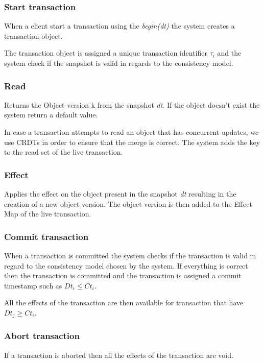 \documentclass[parallelisme]{compas2022}
\begin{document}
\subsubsection{Start transaction}
When a client start a transaction using the \emph{begin(dt)} the system creates a transaction object.

The transaction object is assigned a unique transaction identifier $\tau_i$ and the system check if the snapshot is valid in regards to the consistency model.

\subsubsection{Read}

Returns the Object-version k from the snapshot \emph{dt}. 
If the object doesn't exist the system return a default value.

In case a transaction attempts to read an object that has concurrent updates, we use CRDTs in order to ensure that the merge is correct.
The system adds the key to the read set of the live transaction.

\subsubsection{Effect}

Applies the effect on the object present in the snapshot \emph{dt} resulting in the creation of a new object-version.
The object version is then added to the Effect Map of the live transaction.

\subsubsection{Commit transaction}

When a transaction is committed the system checks if the transaction is valid in regard to the consistency model chosen by the system.
If everything is correct then the transaction is committed and the transaction is assigned a commit timestamp such as $Dt_i \leq Ct_i$.

All the effects of the transaction are then available for transaction that have $Dt_j \geq Ct_i$.


\subsubsection{Abort transaction}

If a transaction is aborted then all the effects of the transaction are void.
\end{document}
